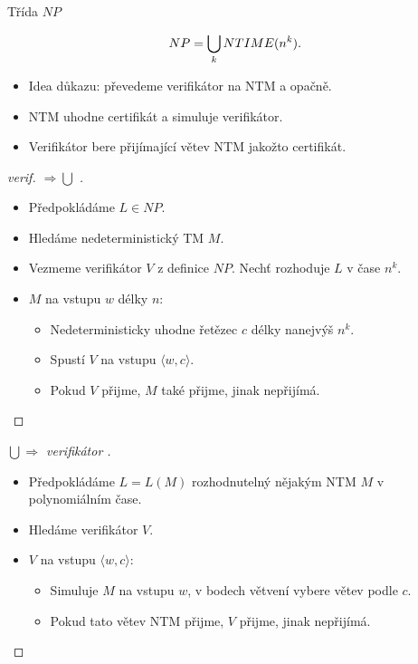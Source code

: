     \begin{frame}{ Třída $NP$}
    \begin{theorem}
    $$NP=\bigcup_k NTIME(n^k)\hbox{.}$$
    \end{theorem}
    \begin{itemize}
        \item Idea důkazu: převedeme verifikátor na NTM a opačně.
        \item NTM uhodne certifikát a simuluje verifikátor.
        \item Verifikátor bere přijímající větev NTM jakožto certifikát.
    \end{itemize}
    \begin{proof}[verif. $\Rightarrow \bigcup$ ]
    \begin{itemize}
        \item Předpokládáme $L\in NP$.
        \item Hledáme nedeterministický TM $M$.
        \item Vezmeme verifikátor $V$ z definice $NP$. Nechť rozhoduje $L$ v čase $n^k$.
        \item $M$ na vstupu $w$ délky $n$:
        
        \begin{itemize}
            \item Nedeterministicky uhodne řetězec $c$ délky nanejvýš $n^k$.
            \item Spustí $V$ na vstupu $\langle w, c\rangle$.
    \item Pokud $V$ přijme, $M$ také přijme, jinak nepřijímá.
        \end{itemize}
    \end{itemize}
    \end{proof}
    \end{frame}
    
    \begin{frame}
    \begin{proof}[ $\bigcup\Rightarrow $ verifikátor ]
    \begin{itemize}
        \item Předpokládáme $L=L(M)$ rozhodnutelný nějakým NTM $M$ v polynomiálním čase.
        \item Hledáme verifikátor $V$.
        \item $V$ na vstupu $\langle w, c\rangle$:
        
        \begin{itemize}
            \item Simuluje $M$ na vstupu $w$, v bodech větvení vybere větev podle $c$.
    \item Pokud tato větev NTM přijme, $V$ přijme, jinak nepřijímá.
        \end{itemize}
    \end{itemize}
    \end{proof}
    \end{frame}
    
